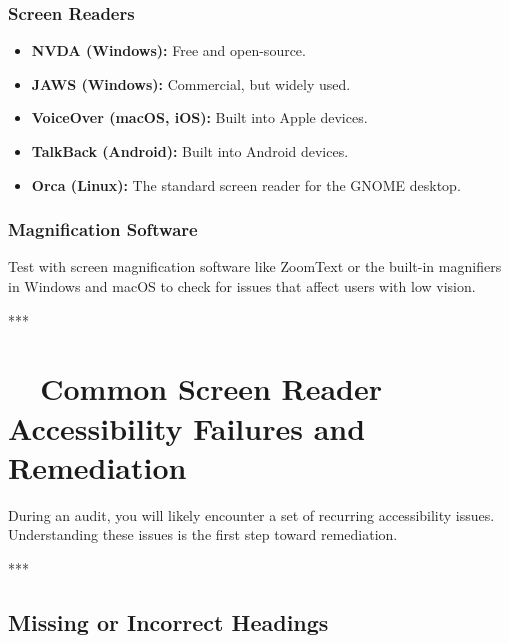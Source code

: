 \subsubsection{Screen Readers}
\label{sub:screen-readers}
\begin{itemize}
	\item \textbf{NVDA (Windows):} Free and open-source.
	\item \textbf{JAWS (Windows):} Commercial, but widely used.
	\item \textbf{VoiceOver (macOS, iOS):} Built into Apple devices.
	\item \textbf{TalkBack (Android):} Built into Android devices.
	\item \textbf{Orca (Linux):} The standard screen reader for the GNOME desktop.
\end{itemize}

\subsubsection{Magnification Software}
\label{sub:magnification-software}
Test with screen magnification software like ZoomText or the built-in magnifiers in Windows and macOS to check for issues that affect users with low vision.

***

\section{~~Common Screen Reader Accessibility Failures and Remediation}
\label{sec:common-screen-reader-accessibility-failures-and-remediation}

During an audit, you will likely encounter a set of recurring accessibility issues. Understanding these issues is the first step toward remediation.

***

\subsection{Missing or Incorrect Headings}
\label{sub:missing-or-incorrect-headings}

